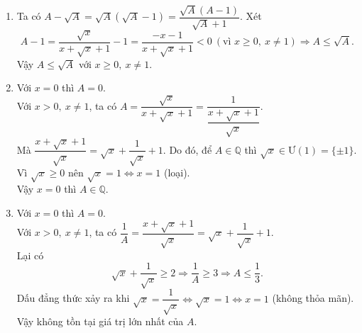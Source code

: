 \begin{bt}
{\begin{enumerate}
\[			\]
			\begin{enumerate}
				\item[] Với $ \heva{&2\sqrt{x}-1>0\\ &\sqrt{x}-2<0}\Leftrightarrow\heva{&\sqrt{x}>\dfrac{1}{2}\\ &\sqrt{x}<2}\Leftrightarrow \dfrac{1}{4}<x<4 $.
				\item[] Với $ \heva{&2\sqrt{x}-1<0\\ &\sqrt{x}-2>0}\Leftrightarrow\heva{&\sqrt{x}<\dfrac{1}{2}\\ &\sqrt{x}>2} $ (vô lí).
			\end{enumerate}
			Vậy $ \dfrac{1}{4}<x<4,\ x\neq 1 $ thì $ A>\dfrac{2}{5} $.
			\item Ta có $ A-\sqrt{A}=\sqrt{A}(\sqrt{A}-1)=\dfrac{\sqrt{A}(A-1)}{\sqrt{A}+1} $. Xét 
			\[ 
			A-1=\dfrac{\sqrt{x}}{x+\sqrt{x}+1}-1=\dfrac{-x-1}{x+\sqrt{x}+1}<0\ (\text{vì }x\geq 0,\ x\neq 1)\Rightarrow A\leq \sqrt{A}.
			\]
			Vậy $ A\leq \sqrt{A} $ với $ x\geq 0,\ x\neq 1 $.
			\item Với $ x=0 $ thì $ A=0 $.\\
			Với $ x>0,\ x\neq 1 $, ta có $ A=\dfrac{\sqrt{x}}{x+\sqrt{x}+1}=\dfrac{1}{\dfrac{x+\sqrt{x}+1}{\sqrt{x}}} $.\\
			Mà $ \dfrac{x+\sqrt{x}+1}{\sqrt{x}}=\sqrt{x}+\dfrac{1}{\sqrt{x}}+1 $. Do đó, để $ A\in \mathbb{Q} $ thì $ \sqrt{x}\in\text{Ư}(1)=\{\pm 1\} $.\\
			Vì $ \sqrt{x}\geq 0 $ nên $ \sqrt{x}=1\Leftrightarrow x=1 $ (loại).\\
			Vậy $ x=0 $ thì $ A\in\mathbb{Q} $.
			\item Với $ x=0 $ thì $ A=0 $.\\
			Với $ x>0,\ x\neq 1 $, ta có $ \dfrac{1}{A}=\dfrac{x+\sqrt{x}+1}{\sqrt{x}}=\sqrt{x}+\dfrac{1}{\sqrt{x}}+1 $.\\
			Lại có
			\[ 
			\sqrt{x}+\dfrac{1}{\sqrt{x}}\geq 2\Rightarrow \dfrac{1}{A}\geq 3\Rightarrow A\leq \dfrac{1}{3}.
			\]
			Dấu đẳng thức xảy ra khi $ \sqrt{x}=\dfrac{1}{\sqrt{x}}\Leftrightarrow \sqrt{x}=1\Leftrightarrow x=1 $ (không thỏa mãn).\\
			Vậy không tồn tại giá trị lớn nhất của $ A $.
		\end{enumerate}
	}
\end{bt}
